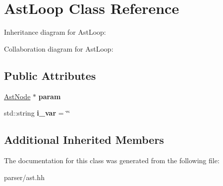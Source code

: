 \hypertarget{classAstLoop}{}\section{Ast\+Loop Class Reference}
\label{classAstLoop}


Inheritance diagram for Ast\+Loop\+:


Collaboration diagram for Ast\+Loop\+:
\subsection*{Public Attributes}
\begin{DoxyCompactItemize}
\item 
\mbox{\label{classAstLoop_aaf7f10279170b5e2e468388a36e88fea}} 
\hyperlink{classAstNode}{Ast\+Node} $\ast$ {\bfseries param}
\item 
\mbox{\label{classAstLoop_a950ad0c324b911650fccf656ca67402b}} 
std\+::string {\bfseries i\+\_\+var} = \char`\"{}\char`\"{}
\end{DoxyCompactItemize}
\subsection*{Additional Inherited Members}


The documentation for this class was generated from the following file\+:\begin{DoxyCompactItemize}
\item 
parser/ast.\+hh\end{DoxyCompactItemize}
